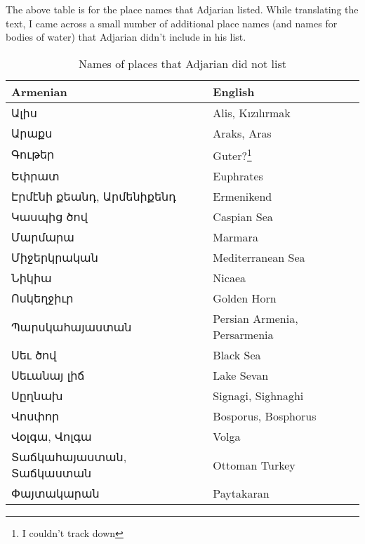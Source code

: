 The above table is for the place names that Adjarian listed. While translating the text, I came across a small number of additional place names (and names for bodies of water) that Adjarian didn't include in his list. 


\begin{table}[H]
	\centering
	\caption{Names of places that Adjarian did not list}
	\label{tab:adjarian:names:other}
	\begin{tabular}{|ll|}
		\hline 
Armenian & English \\		\hline 
		Ալիս  & Alis, Kızılırmak \\
		Արաքս &  Araks, Aras \\
		Գութեր  &  Guter?\footnote{I couldn't track down}  \\
		Եփրատ &  Euphrates \\
		Էրմէնի քեանդ, Արմենիքենդ & Ermenikend \\
		Կասպից ծով & Caspian Sea \\
		Մարմարա&  Marmara \\
		Միջերկրական & Mediterranean Sea \\ 
		Նիկիա&   Nicaea \\
		Ոսկեղջիւր  & Golden Horn \\
		Պարսկահայաստան & Persian Armenia, Persarmenia \\
		Սեւ ծով &  Black Sea\\
		Սեւանայ լիճ  & Lake Sevan \\
		Սըղնախ & Signagi, Sighnaghi \\
		Վոսփոր & Bosporus, Bosphorus \\ 
		Վօլգա, Վոլգա & Volga \\
		Տաճկահայաստան, Տաճկաստան & Ottoman Turkey \\
		Փայտակարան & Paytakaran \\ \hline 
	\end{tabular}
\end{table}

